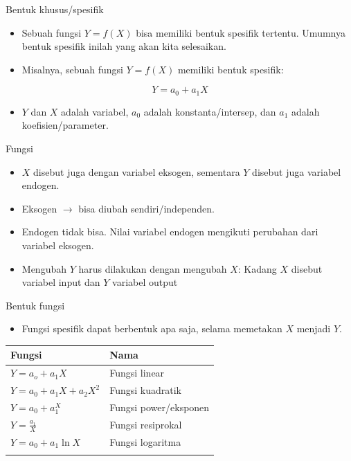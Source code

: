\documentclass[
  ignorenonframetext,
]{beamer}
\providecommand{\tightlist}{%
  \setlength{\itemsep}{0pt}\setlength{\parskip}{0pt}}\usepackage{longtable,booktabs,array}
\begin{document}
\begin{frame}{Bentuk khusus/spesifik}
\label{bentuk-khususspesifik}
\begin{itemize}
\item
  Sebuah fungsi \(Y=f(X)\) bisa memiliki bentuk spesifik tertentu.
  Umumnya bentuk spesifik inilah yang akan kita selesaikan.
\item
  Misalnya, sebuah fungsi \(Y=f(X)\) memiliki bentuk spesifik:
\end{itemize}

\[
Y=a_0+a_1X
\]

\begin{itemize}
\tightlist
\item
  \(Y\) dan \(X\) adalah variabel, \(a_0\) adalah konstanta/intersep,
  dan \(a_1\) adalah koefisien/parameter.
\end{itemize}
\end{frame}

\begin{frame}{Fungsi}
\label{fungsi}
\begin{itemize}
\item
  \(X\) disebut juga dengan variabel eksogen, sementara \(Y\) disebut
  juga variabel endogen.
\item
  Eksogen \(\rightarrow\) bisa diubah sendiri/independen.
\item
  Endogen tidak bisa. Nilai variabel endogen mengikuti perubahan dari
  variabel eksogen.
\item
  Mengubah \(Y\) harus dilakukan dengan mengubah \(X\): Kadang \(X\)
  disebut variabel input dan \(Y\) variabel output
\end{itemize}
\end{frame}

\begin{frame}{Bentuk fungsi}
\label{bentuk-fungsi}
\begin{itemize}
\tightlist
\item
  Fungsi spesifik dapat berbentuk apa saja, selama memetakan \(X\)
  menjadi \(Y\).
\end{itemize}

\begin{longtable}[]{@{}ll@{}}
\toprule\noalign{}
Fungsi & Nama \\
\midrule\noalign{}
\endhead
\(Y=a_o+a_1X\) & Fungsi linear \\
\(Y=a_0+a_1X+a_2X^2\) & Fungsi kuadratik \\
\(Y=a_0+a_1^X\) & Fungsi power/eksponen \\
\(Y=\frac{a_1}{X}\) & Fungsi resiprokal \\
\(Y=a_0+a_1 \ln X\) & Fungsi logaritma \\
\bottomrule\noalign{}
\end{longtable}
\end{frame}
\end{document}
